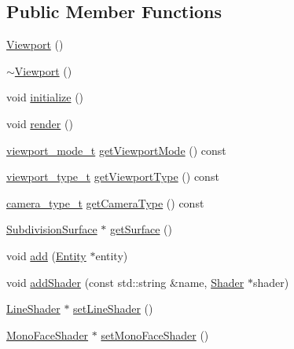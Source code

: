 \subsection*{Public Member Functions}
\begin{DoxyCompactItemize}
\item 
\hyperlink{classShipCAD_1_1Viewport_a9fde8f966d9802dd42254acf0ed05386}{Viewport} ()
\item 
\hyperlink{classShipCAD_1_1Viewport_a1e18a1ff4a52be33ef63d25034561850}{$\sim$\-Viewport} ()
\item 
void \hyperlink{classShipCAD_1_1Viewport_a9c35de3f7c9d7c860c494081b48309b3}{initialize} ()
\item 
void \hyperlink{classShipCAD_1_1Viewport_a9e81b526db3c2b508322c29b9fda5845}{render} ()
\item 
\hyperlink{namespaceShipCAD_a67437198ee14f74e6c5277d761894863}{viewport\-\_\-mode\-\_\-t} \hyperlink{classShipCAD_1_1Viewport_a205e5082395c6d01660ffc179c57b83e}{get\-Viewport\-Mode} () const 
\item 
\hyperlink{namespaceShipCAD_aeeeb05810f2e31ef89fd4ac6b6ba9c0a}{viewport\-\_\-type\-\_\-t} \hyperlink{classShipCAD_1_1Viewport_a5f261a1925f09917013e8e532688326a}{get\-Viewport\-Type} () const 
\item 
\hyperlink{namespaceShipCAD_a58f51ebd2e66de5e41c2ffd6f434241e}{camera\-\_\-type\-\_\-t} \hyperlink{classShipCAD_1_1Viewport_a93c3c8909dc820efd3d0c6211d38d9ec}{get\-Camera\-Type} () const 
\item 
\hyperlink{classShipCAD_1_1SubdivisionSurface}{Subdivision\-Surface} $\ast$ \hyperlink{classShipCAD_1_1Viewport_a0aa9a0ac30a40ebf933977028a25c565}{get\-Surface} ()
\item 
void \hyperlink{classShipCAD_1_1Viewport_a3626f44e62e08918de5939970cdc531c}{add} (\hyperlink{classShipCAD_1_1Entity}{Entity} $\ast$entity)
\item 
void \hyperlink{classShipCAD_1_1Viewport_a886ac5965b63039799827da89bf3de20}{add\-Shader} (const std\-::string \&name, \hyperlink{classShipCAD_1_1Shader}{Shader} $\ast$shader)
\item 
\hyperlink{classShipCAD_1_1LineShader}{Line\-Shader} $\ast$ \hyperlink{classShipCAD_1_1Viewport_a0720a01f8650dc4acf89aad0649d9196}{set\-Line\-Shader} ()
\item 
\hyperlink{classShipCAD_1_1MonoFaceShader}{Mono\-Face\-Shader} $\ast$ \hyperlink{classShipCAD_1_1Viewport_a5f3c02f4e24d614d4340816d6de50b0b}{set\-Mono\-Face\-Shader} ()
\end{DoxyCompactItemize}
